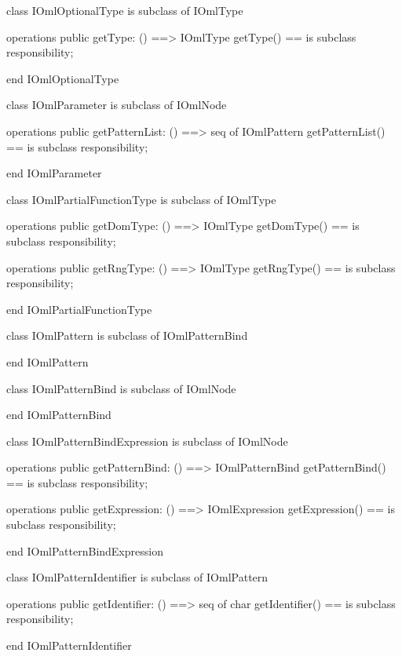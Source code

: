 \begin{vdm_al}
class IOmlOptionalType
 is subclass of IOmlType

operations
  public getType: () ==> IOmlType
  getType() == is subclass responsibility;

end IOmlOptionalType
\end{vdm_al}

\begin{vdm_al}
class IOmlParameter
 is subclass of IOmlNode

operations
  public getPatternList: () ==> seq of IOmlPattern
  getPatternList() == is subclass responsibility;

end IOmlParameter
\end{vdm_al}

\begin{vdm_al}
class IOmlPartialFunctionType
 is subclass of IOmlType

operations
  public getDomType: () ==> IOmlType
  getDomType() == is subclass responsibility;

operations
  public getRngType: () ==> IOmlType
  getRngType() == is subclass responsibility;

end IOmlPartialFunctionType
\end{vdm_al}

\begin{vdm_al}
class IOmlPattern
 is subclass of IOmlPatternBind

end IOmlPattern
\end{vdm_al}

\begin{vdm_al}
class IOmlPatternBind
 is subclass of IOmlNode

end IOmlPatternBind
\end{vdm_al}

\begin{vdm_al}
class IOmlPatternBindExpression
 is subclass of IOmlNode

operations
  public getPatternBind: () ==> IOmlPatternBind
  getPatternBind() == is subclass responsibility;

operations
  public getExpression: () ==> IOmlExpression
  getExpression() == is subclass responsibility;

end IOmlPatternBindExpression
\end{vdm_al}

\begin{vdm_al}
class IOmlPatternIdentifier
 is subclass of IOmlPattern

operations
  public getIdentifier: () ==> seq of char
  getIdentifier() == is subclass responsibility;

end IOmlPatternIdentifier
\end{vdm_al}

